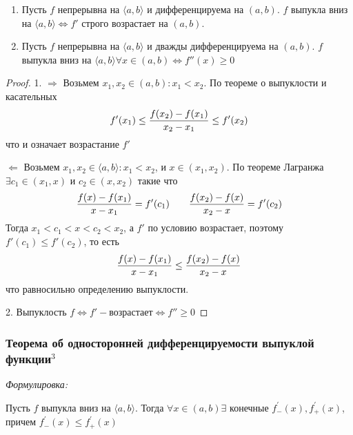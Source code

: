 \documentclass{article}
\begin{document}
\begin{enumerate}
    \item Пусть $f$ непрерывна на $\langle a, b\rangle$ и дифференцируема на $(a, b)$. $f$ выпукла вниз на  $\langle a, b\rangle \Leftrightarrow f'$ строго возрастает на $(a, b)$.
    \item Пусть $f$ непрерывна на $\langle a, b\rangle$ и дважды дифференцируема на $(a, b)$.  $f$ выпукла вниз на $\langle a, b\rangle \forall x \in (a, b) \Leftrightarrow f''(x) \geq 0$
    \end{enumerate}
    \begin{proof}
    \item{1. $\Rightarrow$}
    Возьмем $x_1, x_2 \in (a, b): x_1 < x_2$. По теореме о выпуклости и касательных
    \begin{equation}
    f'(x_1) \leq \frac{f(x_2) - f(x_1)} {x_2 - x_1} \leq f'(x_2)\notag
    \end{equation}
    что и означает возрастание $f'$
    \item{$\Leftarrow$}
    Возьмем $x_1, x_2 \in \langle a, b\rangle: x_1 < x_2$, и $x \in (x_1, x_2)$. По теореме Лагранжа $\exists c_1\in(x_1, x) \text{ и } c_2\in(x, x_2)$ такие что
    \begin{equation}
    \frac{f(x) - f(x_1)} {x -x_1} = f'(c_1) \qquad \frac{f(x_2) - f(x)} {x_2 -x} = f'(c_2)\notag
    \end{equation}
    Тогда $x_1 < c_1 < x < c_2 < x_2$, а $f'$ по условию возрастает, поэтому $f'(c_1) \leq f'(c_2)$, то есть 
    \begin{equation}
    \frac{f(x) - f(x_1)} {x-x_1} \leq \frac{f(x_2) - f(x)} {x_2 - x}\notag
    \end{equation}
    что равносильно определению выпуклости.
    \item{2.}
    Выпуклость $f \Leftrightarrow f' - \text{возрастает} \Leftrightarrow f'' \geq 0$
    \end{proof}

\subsubsection{Теорема об односторонней дифференцируемости выпуклой функции\texorpdfstring{$^3$}{}}

\textit{Формулировка: }

    Пусть $f$ выпукла вниз на $\langle a, b\rangle$. Тогда $\forall x \in (a, b) \exists$ конечные $f^{'}_{-} (x), f^{'}_{+} (x)$, причем $f_{-}^{'}(x) \leq f_{+} ^{'} (x)$
\end{document}
